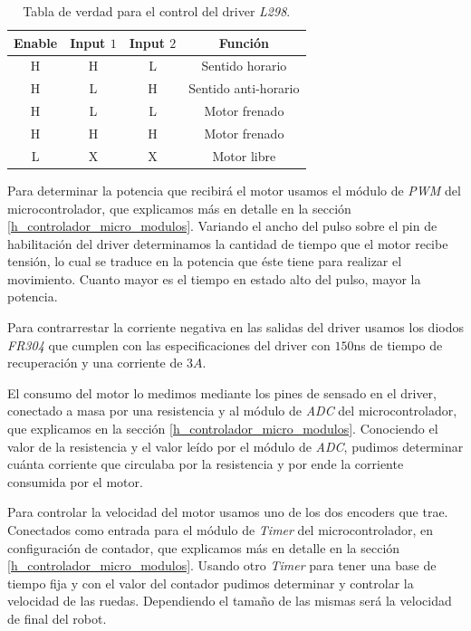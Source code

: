 \begin{table}
	\begin{center}
		\begin{tabular}{|c|c|c|c|}
			\hline
			Enable & Input $1$ & Input $2$ & Funci\'on \\
			\hline
			H & H & L & Sentido horario \\
			H & L & H & Sentido anti-horario \\
			H & L & L & Motor frenado \\
			H & H & H & Motor frenado \\
			L & X & X & Motor libre \\
			\hline
		\end{tabular}
	\end{center}
	\caption{Tabla de verdad para el control del driver \emph{L298}.}
	\label{hT_l298}
\end{table}

Para determinar la potencia que recibir\'a el motor usamos el m\'odulo de \emph{PWM} del microcontrolador, que explicamos m\'as en detalle en la
secci\'on \ref{h_controlador_micro_modulos}.
Variando el ancho del pulso sobre el pin de habilitaci\'on del driver determinamos la cantidad de tiempo que el motor recibe tensi\'on, lo cual
se traduce en la potencia que \'este tiene para realizar el movimiento.
Cuanto mayor es el tiempo en estado alto del pulso, mayor la potencia.

Para contrarrestar la corriente negativa en las salidas del driver usamos los diodos \emph{FR304} que cumplen con las especificaciones del driver
con $150$ns de tiempo de recuperaci\'on y una corriente de $3 A$.

El consumo del motor lo medimos mediante los pines de sensado en el driver, conectado a masa por una resistencia y al m\'odulo de \emph{ADC} del
microcontrolador, que explicamos en la secci\'on \ref{h_controlador_micro_modulos}.
Conociendo el valor de la resistencia y el valor le\'ido por el m\'odulo de \emph{ADC}, pudimos determinar cu\'anta corriente que circulaba por la
resistencia y por ende la corriente consumida por el motor.

Para controlar la velocidad del motor usamos uno de los dos encoders que trae.
Conectados como entrada para el m\'odulo de \emph{Timer} del microcontrolador, en configuraci\'on de contador, que explicamos m\'as en detalle en la
secci\'on \ref{h_controlador_micro_modulos}.
Usando otro \emph{Timer} para tener una base de tiempo fija y con el valor del contador pudimos determinar y controlar la velocidad de las ruedas.
Dependiendo el tama\~no de las mismas ser\'a la velocidad de final del robot.

